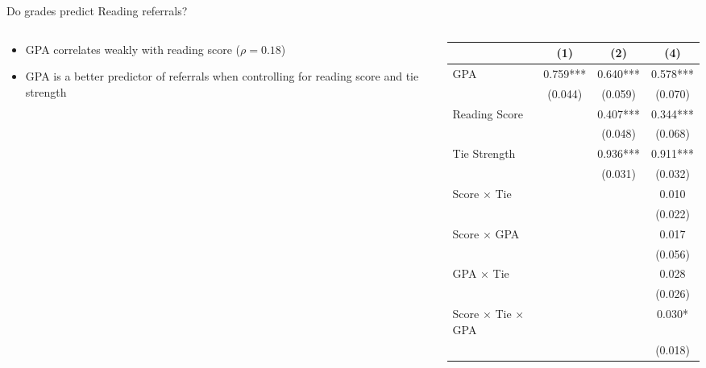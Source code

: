 \documentclass[aspectratio=169,xcolor=dvipsnames]{beamer}
\begin{document}
\begin{frame}{Do grades predict Reading referrals?}
    \begin{columns}[T]
        \begin{column}{0.38\textwidth}
            \vspace{2em}
            \begin{itemize}
                \item GPA correlates weakly with reading score ($\rho = 0.18$)
                \item GPA is a better predictor of referrals when controlling for reading score and tie strength
            \end{itemize}
        \end{column}
        \begin{column}{0.62\textwidth}
            \begin{table}
                \centering
                \footnotesize
                \begin{threeparttable}
                \begin{tabular*}{0.9\columnwidth}{@{\extracolsep{\fill}}lccc}
                \toprule
                 & \multicolumn{1}{c}{(1)} & \multicolumn{1}{c}{(2)} & \multicolumn{1}{c}{(4)} \\
                \midrule
                GPA & 0.759*** & 0.640*** & 0.578*** \\
                 & (0.044) & (0.059) & (0.070) \\
                Reading Score &  & 0.407*** & 0.344*** \\
                 &  & (0.048) & (0.068) \\
                Tie Strength &  & 0.936*** & 0.911*** \\
                 &  & (0.031) & (0.032) \\
                Score × Tie &  &  & 0.010 \\
                 &  &  & (0.022) \\
                Score × GPA &  &  & 0.017 \\
                 &  &  & (0.056) \\
                GPA × Tie &  &  & 0.028 \\
                 &  &  & (0.026) \\
                Score × Tie × GPA &  &  & 0.030* \\
                 &  &  & (0.018) \\
                \bottomrule
                \end{tabular*}
                \label{tab:reading_gpa_regression}
                \end{threeparttable}
            \end{table}
        \end{column}
    \end{columns}
\end{frame}
\end{document}
